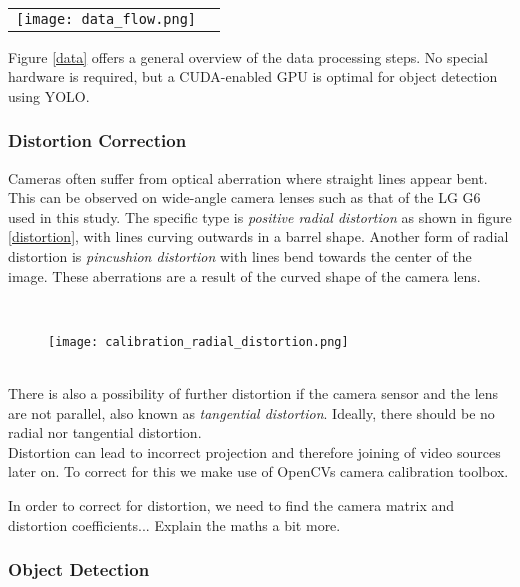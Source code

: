 \ \\ 
\noindent
\begin{tabular}{@{}cc}
\texttt{[image: data\_flow.png]} 
\end{tabular}
\label{data}


Figure \ref{data} offers a general overview of the data processing steps. No special hardware is required, but a CUDA-enabled GPU is optimal for object detection using YOLO.
\ \\
\subsubsection{Distortion Correction}

Cameras often suffer from optical aberration where straight lines appear bent. This can be observed on wide-angle camera lenses such as that of the LG G6 used in this study.
The specific type is \textit{positive radial distortion} as shown in figure \ref{distortion}, with lines curving outwards in a barrel shape.
Another form of radial distortion is \textit{pincushion distortion} with lines bend towards the center of the image. These aberrations are a result 
of the curved shape of the camera lens.

\ \\ 
\begin{figure}[h]
  \texttt{[image: calibration\_radial\_distortion.png]}
  \centering 
  \end{figure}
  \label{distortion}

\ \\

There is also a possibility of further distortion if the camera sensor and the lens are not parallel, also known as \textit{tangential distortion}.
Ideally, there should be no radial nor tangential distortion.
\ \\
Distortion can lead to incorrect projection and therefore joining of video sources later on.
To correct for this we make use of OpenCVs \cite{noauthor_opencv/opencv_2021} camera calibration toolbox.

\color{red}
In order to correct for distortion, we need to find the camera matrix and distortion coefficients... Explain the maths a bit more.
\color{black}
\ \\
\subsubsection{Object Detection}


